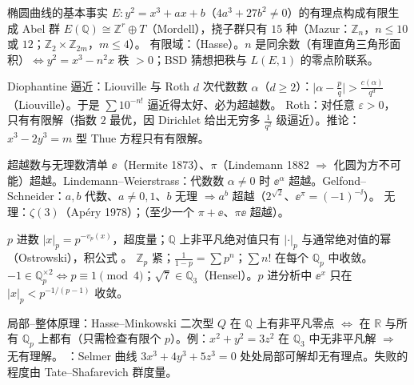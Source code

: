 \begin{结论}{椭圆曲线的基本事实}
$E:y^2=x^3+ax+b$（$4a^3+27b^2\ne0$）的有理点构成有限生成 Abel 群 $E(\mathbb Q)\cong\mathbb Z^r\oplus T$（Mordell），挠子群只有 $15$ 种（Mazur：$\mathbb Z_n$，$n\le10$ 或 $12$；$\mathbb Z_2\times\mathbb Z_{2m}$，$m\le4$）。
有限域：（Hasse）。$n$ 是同余数（有理直角三角形面积）$\iff y^2=x^3-n^2x$ 秩 $>0$；BSD 猜想把秩与 $L(E,1)$ 的零点阶联系。
\end{结论}

\begin{结论}{Diophantine 逼近：Liouville 与 Roth}
$d$ 次代数数 $\alpha$（$d\ge2$）：$\bigl|\alpha-\frac pq\bigr|>\frac{c(\alpha)}{q^d}$（Liouville）。于是 $\sum10^{-n!}$ 逼近得太好、必为超越数。
Roth：对任意 $\varepsilon>0$， 只有有限解（指数 $2$ 最优，因 Dirichlet 给出无穷多 $\frac1{q^2}$ 级逼近）。推论：$x^3-2y^3=m$ 型 Thue 方程只有有限解。
\end{结论}

\begin{结论}{超越数与无理数清单}
$\ee$（Hermite 1873）、$\pi$（Lindemann 1882 $\Rightarrow$ 化圆为方不可能）超越。Lindemann--Weierstrass：代数数 $\alpha\ne0$ 时 $\ee^\alpha$ 超越。Gelfond--Schneider：$a,b$ 代数、$a\ne0,1$、$b$ 无理 $\Rightarrow a^b$ 超越（$2^{\sqrt2}$、$\ee^\pi=(-1)^{-\ii}$）。
无理：$\zeta(3)$（Apéry 1978）；（至少一个 $\pi+\ee$、$\pi\ee$ 超越）。
\end{结论}

\begin{结论}{$p$ 进数}
$|x|_p=p^{-v_p(x)}$，超度量；$\mathbb Q$ 上非平凡绝对值只有 $|\cdot|_p$ 与通常绝对值的幂（Ostrowski），积公式 。
$\mathbb Z_p$ 紧；$\frac1{1-p}=\sum p^n$；$\sum n!$ 在每个 $\mathbb Q_p$ 中收敛。$-1\in\mathbb Q_p^{\times2}\iff p\equiv1\pmod4$；$\sqrt7\in\mathbb Q_3$（Hensel）。$p$ 进分析中 $\ee^x$ 只在 $|x|_p<p^{-1/(p-1)}$ 收敛。
\end{结论}

\begin{结论}{局部--整体原理：Hasse--Minkowski}
二次型 $Q$ 在 $\mathbb Q$ 上有非平凡零点 $\iff$ 在 $\mathbb R$ 与所有 $\mathbb Q_p$ 上都有（只需检查有限个 $p$）。例：$x^2+y^2=3z^2$ 在 $\mathbb Q_3$ 中无非平凡解 $\Rightarrow$ 无有理解。
：Selmer 曲线 $3x^3+4y^3+5z^3=0$ 处处局部可解却无有理点。失败的程度由 Tate--Shafarevich 群度量。
\end{结论}

